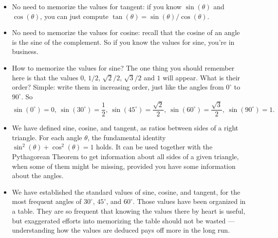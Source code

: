 \documentclass{ximera}
\begin{document}
\begin{itemize}
\item No need to memorize the values for tangent: if you know $\sin(\theta)$ and $\cos(\theta)$, you can just compute $\tan(\theta) = \sin(\theta)/\cos(\theta)$.
\item No need to memorize the values for cosine: recall that the cosine of an angle is the sine of the complement. So if you know the values for sine, you're in business.
\item How to memorize the values for sine? The one thing you should remember here is that the values $0$, $1/2$, $\sqrt{2}/2$, $\sqrt{3}/2$ and $1$ will appear. What is their order? Simple: write them in increasing order, just like the angles from $0^\circ$ to $90^\circ$. So $$\sin(0^\circ) = 0, ~ \sin(30^\circ) = \frac{1}{2}, ~ \sin(45^\circ) = \frac{\sqrt{2}}{2}, ~ \sin(60^\circ) = \frac{\sqrt{3}}{2}, ~ \sin(90^\circ)=1.$$
\end{itemize}

\begin{summary}\begin{itemize}
\item We have defined sine, cosine, and tangent, as ratios between sides of a right triangle. For each angle $\theta$, the fundamental identity $\sin^2(\theta)+\cos^2(\theta)=1$ holds. It can be used together with the Pythagorean Theorem to get information about all sides of a given triangle, when some of them might be missing, provided you have some information about the angles.
\item We have established the standard values of sine, cosine, and tangent, for the most frequent angles of $30^\circ$, $45^\circ$, and $60^\circ$. Those values have been organized in a table. They are so frequent that knowing the values there by heart is useful, but exaggerated efforts into memorizing the table should not be wasted --- understanding how the values are deduced pays off more in the long run.
\end{itemize}\end{summary}
\end{document}
